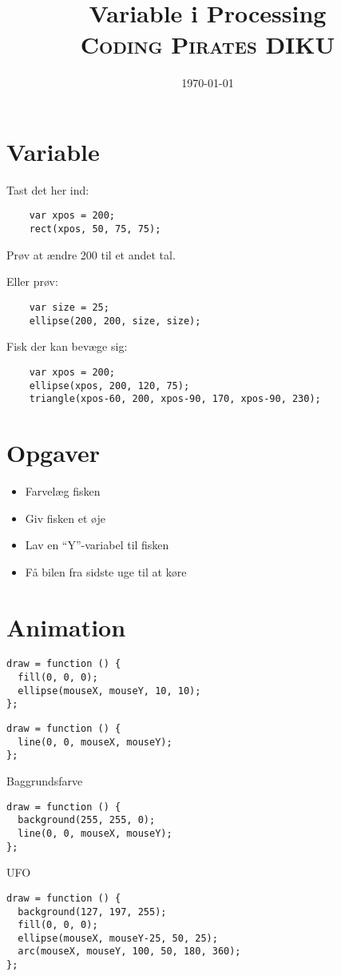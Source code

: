 \documentclass[oneside,a4paper,10pts,article]{memoir}
\title{Variable i Processing
  \\ {\normalfont\small\scshape Coding Pirates DIKU }} \date{\today}
\begin{document}
\maketitle

\chapter{Variable}
Tast det her ind:
\begin{lstlisting}
    var xpos = 200;
    rect(xpos, 50, 75, 75);
\end{lstlisting}
Prøv at ændre 200 til et andet tal.

\vspace{5mm}

\noindent
Eller prøv:
\begin{lstlisting}
    var size = 25;
    ellipse(200, 200, size, size);
\end{lstlisting}

\vspace{5mm}

\noindent
Fisk der kan bevæge sig:
\begin{lstlisting}
    var xpos = 200;
    ellipse(xpos, 200, 120, 75);
    triangle(xpos-60, 200, xpos-90, 170, xpos-90, 230);
\end{lstlisting}

\chapter{Opgaver}
\begin{itemize}
\item Farvelæg fisken
\item Giv fisken et øje
\item Lav en ``Y''-variabel til fisken
\item Få bilen fra sidste uge til at køre
\end{itemize}


\newpage
\chapter{Animation}
\begin{lstlisting}
draw = function () {
  fill(0, 0, 0);
  ellipse(mouseX, mouseY, 10, 10);
};
\end{lstlisting}

\begin{lstlisting}
draw = function () {
  line(0, 0, mouseX, mouseY);
};
\end{lstlisting}

\noindent
Baggrundsfarve
\begin{lstlisting}
draw = function () {
  background(255, 255, 0);
  line(0, 0, mouseX, mouseY);
};
\end{lstlisting}

\noindent
UFO
\begin{lstlisting}
draw = function () {
  background(127, 197, 255);
  fill(0, 0, 0);
  ellipse(mouseX, mouseY-25, 50, 25);
  arc(mouseX, mouseY, 100, 50, 180, 360);
};
\end{lstlisting}
\end{document}
